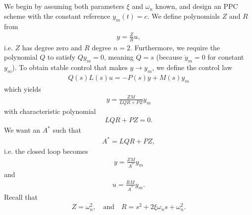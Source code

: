 \documentclass[]{article}
\begin{document}
\subsection{}
We begin by assuming both parameters $\xi$ and $\omega_n$ known, and design an PPC scheme with the constant reference $y_m(t) = c$. We define polynomials $Z$ and $R$ from
\begin{equation}\begin{aligned}
y = \frac{Z}{R}u,
\end{aligned}\end{equation}
i.e. $Z$ has degree zero and $R$ degree $n = 2$. Furthermore, we require the polynomial $Q$ to satisfy $Qy_m = 0$, meaning $Q = s$ (because $\dot y_m = 0$ for constant $y_m$). To obtain stable control that makes $y \rightarrow y_m$, we define the control law
\begin{equation}\begin{aligned}
Q(s) L(s) u = -P(s) y + M(s) y_m
\end{aligned}\end{equation}
which yields
\begin{equation}\begin{aligned}
y = \frac{Z M}{LQR + PZ} y_m
\end{aligned}\end{equation}
with characteristic polynomial
\begin{equation}\begin{aligned}
LQR + PZ = 0.
\end{aligned}\end{equation}
We want an $A^*$ such that
\begin{equation}\begin{aligned}
A^* = LQR + PZ,
\end{aligned}\end{equation}
i.e. the closed loop becomes
\begin{equation}\begin{aligned}
y = \frac{ZM}{A^*}y_m
\end{aligned}\end{equation}
and
\begin{equation}\begin{aligned}
u = \frac{RM}{A^*}y_m.
\end{aligned}\end{equation}
Recall that
\begin{equation}\begin{aligned}
Z = \omega^2_n, \quad \text{and} \quad R = s^2 + 2 \xi \omega_n s + \omega_n^2.
\end{aligned}\end{equation}
\end{document}
